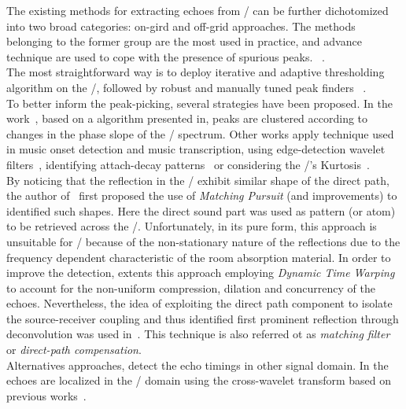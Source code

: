 \mynewline
The existing methods for extracting echoes from \RIRs/ can be further dichotomized into two broad categories: on-gird and off-grid approaches.
The methods belonging to the former group are the most used in practice, and advance technique are used to cope with the presence of spurious peaks.
~.
\\The most straightforward way is to deploy iterative and adaptive thresholding algorithm on the \RIR/, followed by robust and manually tuned peak finders ~.
\\To better inform the peak-picking, several strategies have been proposed.
In the work~, based on a algorithm presented in, peaks are clustered according to changes in the phase slope of the \RIR/ spectrum.
Other works apply technique used in music onset detection and music transcription, using edge-detection wavelet filters~, identifying attach-decay patterns~ or considering the \RIR/'s Kurtosis~.
\\By noticing that the reflection in the \RIRs/ exhibit similar shape of the direct path, the author of~ first proposed the use of \textit{Matching Pursuit} (and improvements) to identified such shapes.
Here the direct sound part was used as pattern (or atom) to be retrieved across the \RIR/.
Unfortunately, in its pure form, this approach is unsuitable for \RIRs/ because of the non-stationary nature of the reflections due to the frequency dependent characteristic of the room absorption material.
In order to improve the detection,  extents this approach employing \textit{Dynamic Time Warping} to account for the non-uniform compression, dilation and concurrency of the echoes.
Nevertheless, the idea of exploiting the direct path component to isolate the source-receiver coupling and thus identified first prominent reflection through deconvolution was used in~.
This technique is also referred ot as \textit{matching filter} or \textit{direct-path compensation}.
\\Alternatives approaches, detect the echo timings in other signal domain.
In  the echoes are localized in the \TFdef/ domain using the cross-wavelet transform based on previous works~.
